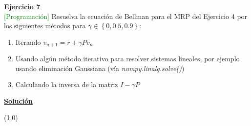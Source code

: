 \indent\underline{\textbf{Ejercicio 7}}\\
\textcolor{green}{[Programación]} Resuelva la ecuación de Bellman para el MRP del Ejercicio 4 por los siguientes métodos para $\gamma \in \left\{0, 0.5, 0.9\right\}$:

\begin{enumerate}
    \item Iterando $v_{n+1} = r + \gamma P v_n$
    \item Usando algún método iterativo para resolver sistemas lineales, por ejemplo usando eliminación Gaussiana (vía \textit{numpy.linalg.solve()})
    \item Calculando la inversa de la matriz $I - \gamma P$
\end{enumerate}

\indent\underline{\textbf{Solución}}\\
\lipsum[4]

\line(1,0){\textwidth}
